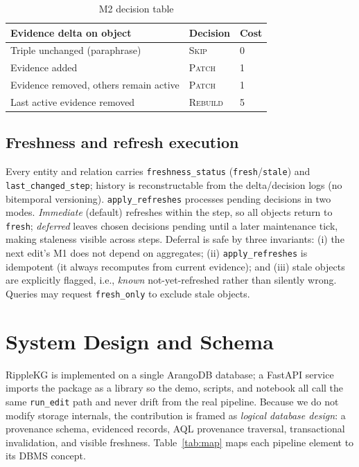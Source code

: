 \documentclass[conference]{IEEEtran}
\begin{document}
\begin{table}[t]
\caption{M2 decision table}
\label{tab:policy}
\centering
\footnotesize
\begin{tabular}{p{}ll}
\toprule
\textbf{Evidence delta on object} & \textbf{Decision} & \textbf{Cost}\\
\midrule
Triple unchanged (paraphrase) & \textsc{Skip} & 0\\
Evidence added & \textsc{Patch} & 1\\
Evidence removed, others remain active & \textsc{Patch} & 1\\
Last active evidence removed & \textsc{Rebuild} & 5\\
\bottomrule
\end{tabular}
\end{table}

\subsection{Freshness and refresh execution}
\label{sec:fresh}
Every entity and relation carries \texttt{freshness\_status}
(\texttt{fresh}/\texttt{stale}) and \texttt{last\_changed\_step}; history is
reconstructable from the delta/decision logs (no bitemporal versioning).
\texttt{apply\_refreshes} processes pending decisions in two modes.
\emph{Immediate} (default) refreshes within the step, so all objects return to
\texttt{fresh}; \emph{deferred} leaves chosen decisions pending until a later
maintenance tick, making staleness visible across steps. Deferral is safe by
three invariants: (i) the next edit's M1 does not depend on aggregates;
(ii) \texttt{apply\_refreshes} is idempotent (it always recomputes from current
evidence); and (iii) stale objects are explicitly flagged, i.e., \emph{known}
not-yet-refreshed rather than silently wrong. Queries may request
\texttt{fresh\_only} to exclude stale objects.

\section{System Design and Schema}
\label{sec:system}
RippleKG is implemented on a single ArangoDB database; a FastAPI service imports
the package as a library so the demo, scripts, and notebook all call the same
\texttt{run\_edit} path and never drift from the real pipeline. Because we do not
modify storage internals, the contribution is framed as \emph{logical database
design}: a provenance schema, evidenced records, AQL provenance traversal,
transactional invalidation, and visible freshness. Table~\ref{tab:map} maps each
pipeline element to its DBMS concept.
\end{document}
